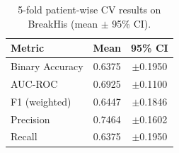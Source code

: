 \begin{table}[h]\centering
\caption{5-fold patient-wise CV results on BreakHis (mean $\pm$ 95\% CI).}
\begin{tabular}{lcc}\hline
Metric & Mean & 95\% CI \\\hline
Binary Accuracy & 0.6375 & $\pm$0.1950 \\
AUC-ROC & 0.6925 & $\pm$0.1100 \\
F1 (weighted) & 0.6447 & $\pm$0.1846 \\
Precision & 0.7464 & $\pm$0.1602 \\
Recall & 0.6375 & $\pm$0.1950 \\
\hline\end{tabular}\label{tab:cv}\end{table}